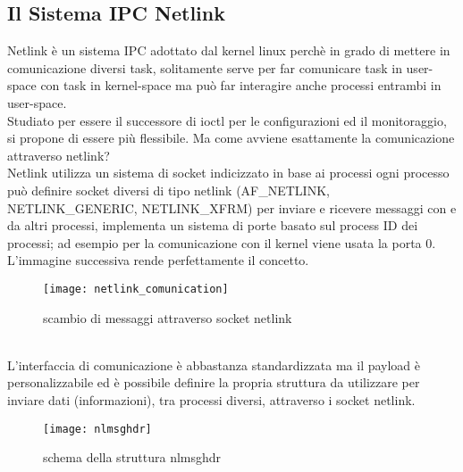 \subsection{Il Sistema IPC Netlink}
Netlink \`e un sistema IPC adottato dal kernel linux perch\`e in grado di mettere in comunicazione diversi task, solitamente serve per far comunicare task in user-space con task in kernel-space ma pu\`o far interagire anche processi entrambi in user-space.\\
Studiato per essere il successore di ioctl per le configurazioni ed il monitoraggio, si propone di essere pi\`u flessibile.
Ma come avviene esattamente la comunicazione attraverso netlink?\\
Netlink utilizza un sistema di socket indicizzato in base ai processi ogni processo pu\`o definire socket diversi di tipo netlink (AF\_NETLINK, NETLINK\_GENERIC, NETLINK\_XFRM) per inviare e ricevere messaggi con e da altri processi, implementa un sistema di porte basato sul process ID dei processi; ad esempio per la comunicazione con il kernel viene usata la porta 0.\\
L'immagine successiva rende perfettamente il concetto.
\begin{figure}[h]                       %
\begin{center}                          %
\texttt{[image: netlink\_comunication]}%
%
\caption[comunicazione netlink]{scambio di messaggi attraverso socket netlink}
\end{center}
\end{figure}\\
L'interfaccia di comunicazione \`e abbastanza standardizzata ma il payload \`e personalizzabile ed \`e possibile definire la propria struttura da utilizzare per inviare dati (informazioni), tra processi diversi, attraverso i socket netlink.
\begin{figure}[h]                       %
\begin{center}                          %
\texttt{[image: nlmsghdr]}%
%
\caption[struct nlmsghdr]{schema della struttura nlmsghdr}
\end{center}
\end{figure}\\
